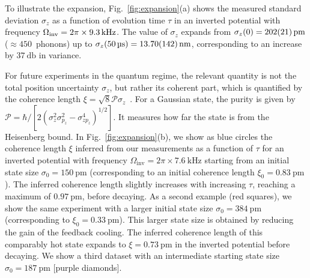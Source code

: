 \documentclass[aps,prl,reprint,twocolumn,superscriptaddress]{revtex4-2}
\begin{document}
To illustrate the expansion, Fig.~\ref{fig:expansion}(a) shows the measured standard deviation $\sigma_z$ as a function of evolution time $\tau$ in an inverted potential with frequency $\Omega_{\rm inv}=2\pi\times\SI{9.3}{\kilo\hertz}$.
The value of $\sigma_z$ expands from $\sigma_z(0)=\SI{202 \pm 21}{\pico\meter}$ ($\approx 450$~phonons) up to $\sigma_z(\SI{50}{\micro\second})=\SI{13.7 \pm 1.42}{\nano\meter}$, corresponding to an increase by $\SI{37}{\decibel}$ in variance.


For future experiments in the quantum regime, the relevant quantity is not the total position uncertainty $\sigma_z$, but rather its coherent part, which is quantified by the coherence length $\xi = \sqrt{8}\mathcal{P}\sigma_z$~\cite{romero2011quantumsuperposition}.
For a Gaussian state, the purity is given by $\mathcal{P} =\hbar/[2(\sigma^2_z\sigma^2_{p_z} - \sigma^4_{zp_z})^{1/2}]$. It measures how far the state is from the Heisenberg bound. 
In Fig.~\ref{fig:expansion}(b), we show as blue circles the coherence length $\xi$ inferred from our measurements as a function of $\tau$ for an inverted potential with frequency $\Omega_{\mathrm{inv}} = 2\pi \times \SI{7.6}{\kilo\hertz}$ starting from an initial state size $\sigma_0=\SI{150}{\pico\meter}$ (corresponding to an initial coherence length $\xi_0=\SI{0.83}{\pico\meter}$). 
The inferred coherence length slightly increases with increasing $\tau$, reaching a maximum of $\SI{0.97}{\pico\meter}$, before decaying. 
As a second example (red squares), we show the same experiment with a larger initial state size $\sigma_0=\SI{384}{\pico\meter}$ (corresponding to $\xi_0=\SI{0.33}{\pico\meter}$). This larger state size is obtained by reducing the gain of the feedback cooling. 
The inferred coherence length of this comparably hot state expands to $\xi=\SI{0.73}{\pico\meter}$ in the inverted potential before decaying. 
We show a third dataset with an intermediate starting state size $\sigma_0=\SI{187}{\pico\meter}$ [purple diamonds]. 
%

\end{document}
